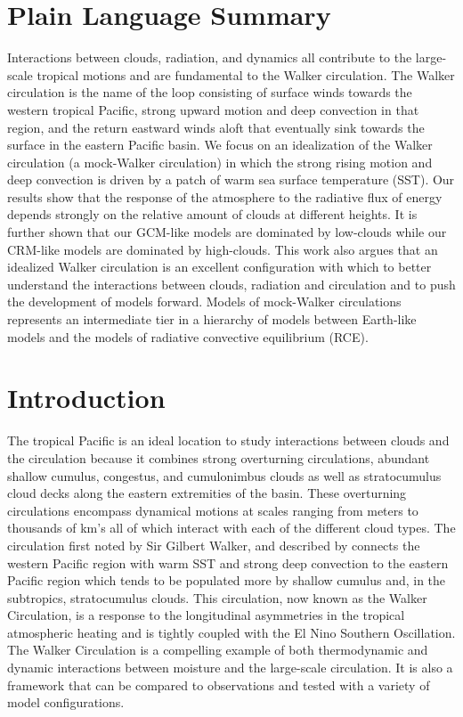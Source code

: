 \documentclass[draft]{agujournal2019}
\begin{document}
\section*{Plain Language Summary}
Interactions between clouds, radiation, and dynamics all contribute
to the large-scale tropical motions and are fundamental to the Walker circulation.  
The Walker circulation is the name of the loop consisting of surface winds towards the western tropical Pacific, 
strong upward motion and deep convection in that region,  and the return eastward winds aloft that 
eventually sink towards the surface in the eastern Pacific basin.  
We focus on an idealization of the Walker circulation (a mock-Walker circulation) 
in which the strong rising motion and deep convection is driven by a patch of warm sea surface temperature (SST).  
Our results show that the response of the atmosphere to the 
radiative flux of energy depends strongly on the relative amount of clouds at different heights.   
It is further shown that our GCM-like models are dominated by low-clouds while our CRM-like models 
are dominated by high-clouds.  This work also argues that an idealized Walker circulation is an 
excellent configuration with which to better understand the interactions between clouds, radiation and circulation 
and to push the development of models forward.   Models of mock-Walker circulations represents
an intermediate tier in a hierarchy of models between Earth-like models and the models of 
radiative convective equilibrium (RCE).  


\section{Introduction}

The tropical Pacific is an ideal location to study interactions between clouds and the circulation 
because it combines strong overturning circulations, abundant shallow cumulus, congestus, and cumulonimbus 
clouds \cite{Johnson1999} as well as stratocumulus cloud decks along the eastern extremities of the basin.
These overturning circulations encompass dynamical motions at scales
ranging from meters to thousands of km's all of which interact with each of the different cloud types.
The circulation first noted by Sir Gilbert Walker, and described by  connects the 
western Pacific region with warm SST and strong deep convection to the eastern Pacific region which tends to 
be populated more by shallow cumulus and, in the subtropics, stratocumulus clouds.  
This circulation, now known as the Walker Circulation, is a response to the 
longitudinal asymmetries in the tropical atmospheric heating and is tightly coupled with 
the El Nino Southern Oscillation.    
The Walker Circulation is a compelling example of both thermodynamic and dynamic interactions
between moisture and the large-scale circulation.  It is also a framework that can be compared 
to observations and tested with a variety of model configurations. 
\end{document}
